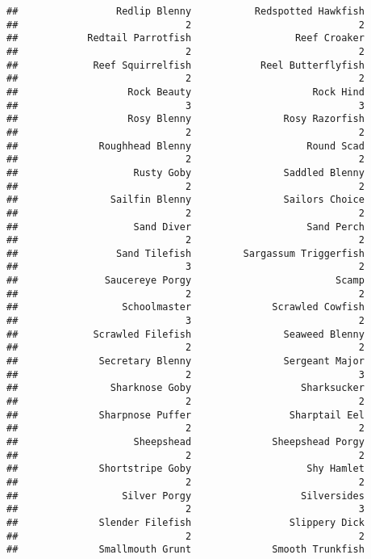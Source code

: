 \documentclass[
]{article}
\begin{document}
\begin{verbatim}
##                 Redlip Blenny           Redspotted Hawkfish 
##                             2                             2 
##            Redtail Parrotfish                  Reef Croaker 
##                             2                             2 
##             Reef Squirrelfish            Reel Butterflyfish 
##                             2                             2 
##                   Rock Beauty                     Rock Hind 
##                             3                             3 
##                   Rosy Blenny                Rosy Razorfish 
##                             2                             2 
##              Roughhead Blenny                    Round Scad 
##                             2                             2 
##                    Rusty Goby                Saddled Blenny 
##                             2                             2 
##                Sailfin Blenny                Sailors Choice 
##                             2                             2 
##                    Sand Diver                    Sand Perch 
##                             2                             2 
##                 Sand Tilefish         Sargassum Triggerfish 
##                             3                             2 
##               Saucereye Porgy                         Scamp 
##                             2                             2 
##                  Schoolmaster              Scrawled Cowfish 
##                             3                             2 
##             Scrawled Filefish                Seaweed Blenny 
##                             2                             2 
##              Secretary Blenny                Sergeant Major 
##                             2                             3 
##                Sharknose Goby                   Sharksucker 
##                             2                             2 
##              Sharpnose Puffer                 Sharptail Eel 
##                             2                             2 
##                    Sheepshead              Sheepshead Porgy 
##                             2                             2 
##              Shortstripe Goby                    Shy Hamlet 
##                             2                             2 
##                  Silver Porgy                   Silversides 
##                             2                             3 
##              Slender Filefish                 Slippery Dick 
##                             2                             2 
##              Smallmouth Grunt              Smooth Trunkfish 

\end{verbatim}
\end{document}
